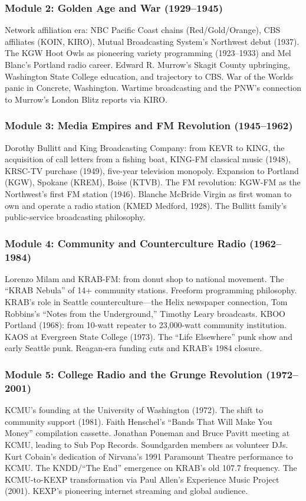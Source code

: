 \documentclass[11pt,letterpaper]{article}
\begin{document}
\subsubsection{Module 2: Golden Age and War (1929--1945)}
Network affiliation era: NBC Pacific Coast chains (Red/Gold/Orange), CBS affiliates (KOIN, KIRO), Mutual Broadcasting System's Northwest debut (1937). The KGW Hoot Owls as pioneering variety programming (1923--1933) and Mel Blanc's Portland radio career. Edward R. Murrow's Skagit County upbringing, Washington State College education, and trajectory to CBS. War of the Worlds panic in Concrete, Washington. Wartime broadcasting and the PNW's connection to Murrow's London Blitz reports via KIRO.

\subsubsection{Module 3: Media Empires and FM Revolution (1945--1962)}
Dorothy Bullitt and King Broadcasting Company: from KEVR to KING, the acquisition of call letters from a fishing boat, KING-FM classical music (1948), KRSC-TV purchase (1949), five-year television monopoly. Expansion to Portland (KGW), Spokane (KREM), Boise (KTVB). The FM revolution: KGW-FM as the Northwest's first FM station (1946). Blanche McBride Virgin as first woman to own and operate a radio station (KMED Medford, 1928). The Bullitt family's public-service broadcasting philosophy.

\subsubsection{Module 4: Community and Counterculture Radio (1962--1984)}
Lorenzo Milam and KRAB-FM: from donut shop to national movement. The ``KRAB Nebula'' of 14+ community stations. Freeform programming philosophy. KRAB's role in Seattle counterculture---the Helix newspaper connection, Tom Robbins's ``Notes from the Underground,'' Timothy Leary broadcasts. KBOO Portland (1968): from 10-watt repeater to 23,000-watt community institution. KAOS at Evergreen State College (1973). The ``Life Elsewhere'' punk show and early Seattle punk. Reagan-era funding cuts and KRAB's 1984 closure.

\subsubsection{Module 5: College Radio and the Grunge Revolution (1972--2001)}
KCMU's founding at the University of Washington (1972). The shift to community support (1981). Faith Henschel's ``Bands That Will Make You Money'' compilation cassette. Jonathan Poneman and Bruce Pavitt meeting at KCMU, leading to Sub Pop Records. Soundgarden members as volunteer DJs. Kurt Cobain's dedication of Nirvana's 1991 Paramount Theatre performance to KCMU. The KNDD/``The End'' emergence on KRAB's old 107.7 frequency. The KCMU-to-KEXP transformation via Paul Allen's Experience Music Project (2001). KEXP's pioneering internet streaming and global audience.
\end{document}
